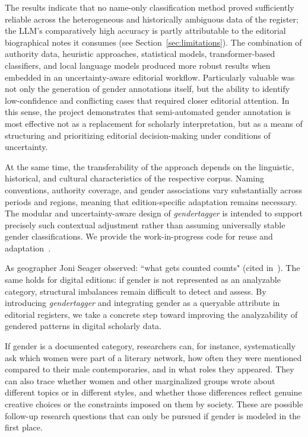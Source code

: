 \documentclass{eceasst}
\begin{document}
The results indicate that no name-only classification method proved sufficiently reliable across the heterogeneous and historically ambiguous data of the register; the LLM's comparatively high accuracy is partly attributable to the editorial biographical notes it consumes (see Section~\ref{sec:limitations}). The combination of authority data, heuristic approaches, statistical models, transformer-based classifiers, and local language models produced more robust results when embedded in an uncertainty-aware editorial workflow. Particularly valuable was not only the generation of gender annotations itself, but the ability to identify low-confidence and conflicting cases that required closer editorial attention. In this sense, the project demonstrates that semi-automated gender annotation is most effective not as a replacement for scholarly interpretation, but as a means of structuring and prioritizing editorial decision-making under conditions of uncertainty.

At the same time, the transferability of the approach depends on the linguistic, historical, and cultural characteristics of the respective corpus. Naming conventions, authority coverage, and gender associations vary substantially across periods and regions, meaning that edition-specific adaptation remains necessary. The modular and uncertainty-aware design of \textit{gendertagger} is intended to support precisely such contextual adjustment rather than assuming universally stable gender classifications. We provide the work-in-progress code for reuse and adaptation~\cite{gendertagger_software_2026}.

As geographer Joni Seager observed: ``what gets counted counts" (cited in~\cite{dignazio_4_2020}). The same holds for digital editions: if gender is not represented as an analyzable category, structural imbalances remain difficult to detect and assess. By introducing \textit{gendertagger} and integrating gender as a queryable attribute in editorial registers, we take a concrete step toward improving the analyzability of gendered patterns in digital scholarly data.

If gender is a documented category, researchers can, for instance, systematically ask which women were part of a literary network, how often they were mentioned compared to their male contemporaries, and in what roles they appeared. They can also trace whether women and other marginalized groups wrote about different topics or in different styles, and whether those differences reflect genuine creative choices or the constraints imposed on them by society. These are possible follow-up research questions that can only be pursued if gender is modeled in the first place.
\end{document}

